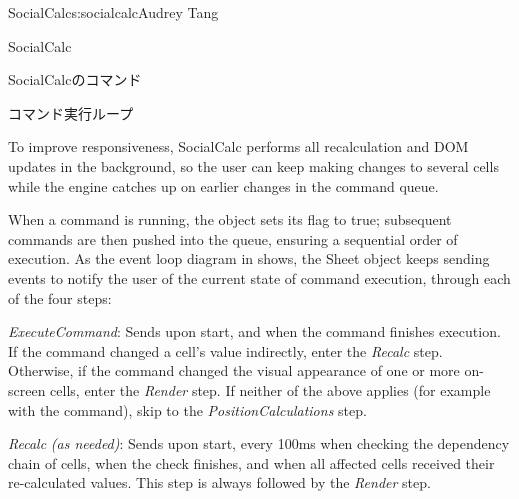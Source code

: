 \begin{aosachapter}{SocialCalc}{s:socialcalc}{Audrey Tang}
\begin{aosasect1}{SocialCalc}
\begin{table}[ht]
\begin{minipage}[b]{0.6\linewidth}
\end{minipage}
\caption{SocialCalcのコマンド}
\label{tbl.soc.commands}
\end{table}

\end{aosasect1}

\begin{aosasect1}{コマンド実行ループ}

To improve responsiveness, SocialCalc performs all recalculation and
DOM updates in the background, so the user can keep making changes to
several cells while the engine catches up on earlier changes in the
command queue.


When a command is running, the  object sets its
 flag to true; subsequent commands are then pushed into the
 queue, ensuring a sequential order of
execution.  As the event loop diagram in 
shows, the Sheet object keeps sending  events to
notify the user of the current state of command execution, through
each of the four steps:

\begin{aosadescription}

  \item{\emph{ExecuteCommand}}: Sends  upon start, and
    when the command finishes execution.  If the command
   changed a cell's value indirectly, enter the \emph{Recalc} step.
   Otherwise, if the command changed the visual appearance of one or
   more on-screen cells, enter the \emph{Render} step.  If neither of
   the above applies (for example with the  command), skip
   to the \emph{PositionCalculations} step.

\pagebreak

  \item{\emph{Recalc}} \emph{(as{ }needed)}: Sends  upon start,
   every 100ms when checking the dependency chain of
  cells,  when the check finishes, and
   when all affected cells received their
  re-calculated values.  This step is always followed by the \emph{Render}
  step.


\end{aosadescription}
\end{aosasect1}
\end{aosachapter}
